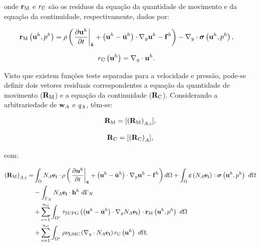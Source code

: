 \documentclass[tese_patricia]{subfiles}%
\begin{document}
\noindent onde $\mathbf{r}_{\mathrm{M}}$ e ${r}_{\mathrm{C}}$ são os resíduos da equação da quantidade de movimento e da equação da continuidade, respectivamente, dados por:

\begin{align}
\mathbf{r}_{\mathrm{M}}\left(\mathbf{u}^h,p^h\right)&=\rho\left(\left. \frac{\partial\mathbf{u}^h}{\partial t}\right|_{\bar{\mathbf{x}}}+\left(\mathbf{u}^h - \bar{\mathbf{u}}^h \right)\cdot \nabla_y \mathbf{u}^h - \mathbf{f}^h\right) - \nabla_y \cdot \boldsymbol{\sigma}\left(\mathbf{u}^h,p^h\right),
\end{align}

\noindent

\begin{align}
{r}_{\mathrm{C}}\left(\mathbf{u}^h\right)&=\nabla_y \cdot \mathbf{u}^h.
\end{align}

Visto que existem funções teste separadas para a velocidade e pressão, pode-se definir dois vetores residuais correspondentes a equação da quantidade de movimento ($\mathbf{R}_\mathrm{M}$) e a equação da continuidade ($\mathbf{R}_\mathrm{C}$). Considerando a arbitrariedade de $\mathbf{w}_{A}$ e $q_{A}$, têm-se:

\begin{align}
\mathbf{R}_\mathrm{M}  = [\left(\mathbf{R}_\mathrm{M}\right)_{A,i}],
\end{align}

\begin{align}
	\mathbf{R}_\mathrm{C} =  [\left(\mathbf{R}_\mathrm{C}\right)_{A}],
\end{align}
	
\noindent com:

\begin{align}
	\begin{split}
	\left(\mathbf{R}_\mathrm{M}\right)_{A,i} =&\int_{\Omega} N_{A}\mathbf{e_i} \cdot \rho\left(\left. \frac{\partial\mathbf{u}^h}{\partial t}\right|_{\bar{\mathbf{x}}}+\left(\mathbf{u}^h - \bar{\mathbf{u}}^h \right)\cdot \nabla_y \mathbf{u}^h - \mathbf{f}^h\right) d\Omega +\int_{\Omega} \bm{\varepsilon} \left(N_{A}\mathbf{e_i}\right) : \boldsymbol{\sigma} \left(\mathbf{u}^h,p^h\right)\ d\Omega\\ &
	- \int_{\Gamma_N}N_{A}\mathbf{e_i} \cdot \mathbf{h}^h\ d\Gamma_{N}\\ 
	&+ \sum_{e=1}^{n_{\mathrm{el}}} \int_{\Omega^e} \tau_{\mathrm{SUPG}} \left(\left(\mathbf{u}^h - \bar{\mathbf{u}}^h \right) \cdot \nabla_y N_{A}\mathbf{e_i}\right) \cdot \mathbf{r}_{\mathrm{M}}\left(\mathbf{u}^h,p^h \right)\  d\Omega\\
	&+ \sum_{e=1}^{n_{\mathrm{el}}} \int_{\Omega^e} \rho \nu_{\mathrm{LSIC}} \left(\nabla_y \cdot N_{A}\mathbf{e_i}\right) {r}_{\mathrm{C}}\left(\mathbf{u}^h\right)\  d\Omega  ,
	\end{split}
\end{align}
\end{document}
